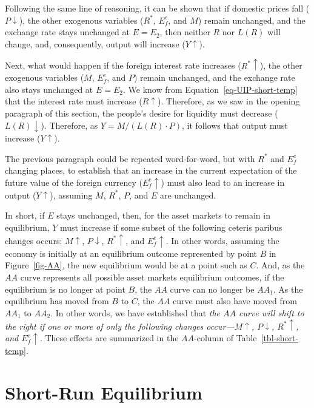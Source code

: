 \documentclass[
  letterpaper,
]{book}
\theoremstyle{plain}
\theoremstyle{remark}
\begin{document}
Following the same line of reasoning, it can be shown that if domestic
prices fall (\(P\downarrow\)), the other exogenous variables (\(R^*\),
\(E_f^e\), and \(M\)) remain unchanged, and the exchange rate stays
unchanged at \(E=E_2\), then neither \(R\) nor \(L(R)\) will change,
and, consequently, output will increase (\(Y\uparrow\)).

Next, what would happen if the foreign interest rate increases
(\(R^*\uparrow\)), the other exogenous variables (\(M\), \(E_f^e\), and
\(P\)) remain unchanged, and the exchange rate also stays unchanged at
\(E=E_2\). We know from Equation~\ref{eq-UIP-short-temp} that the
interest rate must increase (\(R\uparrow\)). Therefore, as we saw in the
opening paragraph of this section, the people's desire for liquidity
must decrease (\(L(R)\downarrow\)). Therefore, as \(Y=M/(L(R)\cdot P)\),
it follows that output must increase (\(Y\uparrow\)).

The previous paragraph could be repeated word-for-word, but with \(R^*\)
and \(E_f^e\) changing places, to establish that an increase in the
current expectation of the future value of the foreign currency
(\(E_f^e\uparrow\)) must also lead to an increase in output
(\(Y\uparrow\)), assuming \(M\), \(R^*\), \(P\), and \(E\) are
unchanged.

In short, if \(E\) stays unchanged, then, for the asset markets to
remain in equilibrium, \(Y\) must increase if some subset of the
following ceteris paribus changes occurs: \(M\uparrow\),
\(P\downarrow\), \(R^*\uparrow\), and \(E_f^e\uparrow\). In other words,
assuming the economy is initially at an equilibrium outcome represented
by point \(B\) in Figure~\ref{fig-AA}, the new equilibrium would be at a
point such as \(C\). And, as the \(AA\) curve represents all possible
asset markets equilibrium outcomes, if the equilibrium is no longer at
point \(B\), the \(AA\) curve can no longer be \(AA_1\). As the
equilibrium has moved from \(B\) to \(C\), the \(AA\) curve must also
have moved from \(AA_1\) to \(AA_2\). In other words, we have
established that \emph{the \(AA\) curve will shift to the right if one
or more of only the following changes occur---\(M\uparrow\),
\(P\downarrow\), \(R^*\uparrow\), and \(E_f^e\uparrow\)}. These effects
are summarized in the \(AA\)-column of Table~\ref{tbl-short-temp}.

\section{Short-Run Equilibrium}\label{sec-eqm-short-temp}
\end{document}

